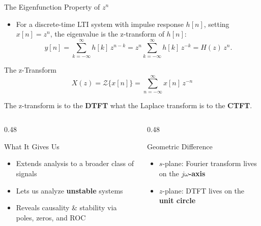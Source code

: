 \begin{frame}[t]{The Eigenfunction Property of \texorpdfstring{$z^n$}{z^n}}
  \small
  \begin{itemize}
    \item For a discrete-time LTI system with impulse response $h[n]$, setting $x[n]=z^n$, the eigenvalue is the z-transform of $h[n]$:
      \[
        y[n] = \sum_{k=-\infty}^{\infty} h[k]\,z^{n-k}
        = z^n \sum_{k=-\infty}^{\infty} h[k]\,z^{-k}
        = H(z)\,z^{n}.
      \]
  \end{itemize}

  \begin{conceptbox}{The z-Transform}
    \vspace{-0.2cm}
    \[
      X(z) = \mathcal{Z}\{x[n]\} = \sum_{n=-\infty}^{\infty} x[n]\,z^{-n}
    \]
    \vspace{-0.3cm}

    The z-transform is to the \textbf{DTFT} what the Laplace transform is to the \textbf{CTFT}.
  \end{conceptbox}
  \vspace{-0.1cm}
  \begin{columns}[T]
    \begin{column}{0.48\textwidth}
      \begin{insightbox}{What It Gives Us}
        \footnotesize
      \begin{itemize}\setlength\itemsep{0pt}
          \item Extends analysis to a broader class of signals
          \item Lets us analyze \textbf{unstable} systems
          \item Reveals causality \& stability via poles, zeros, and ROC
        \end{itemize}
      \end{insightbox}
    \end{column}
    \begin{column}{0.48\textwidth}
      \begin{insightbox}{Geometric Difference}
        \footnotesize
      \begin{itemize}\setlength\itemsep{0pt}
          \item $s$-plane: Fourier transform lives on the \textbf{$j\omega$-axis}
          \item $z$-plane: DTFT lives on the \textbf{unit circle}
        \end{itemize}
      \end{insightbox}
    \end{column}
  \end{columns}
\end{frame}

